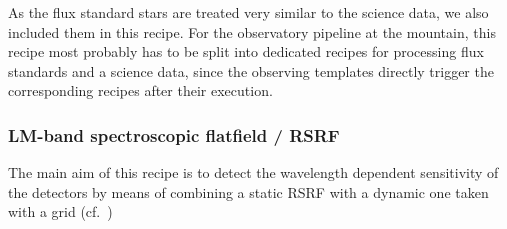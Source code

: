 As the flux standard stars are treated very similar to the science
data, we also included them in this recipe. For the observatory
pipeline at the mountain, this recipe most probably has to be split
into dedicated recipes for processing flux standards and a science
data, since the observing templates directly trigger the corresponding
recipes after their execution.

\clearpage

\subsubsection{LM-band spectroscopic flatfield / RSRF}
\label{sssec:LM_LSS_flat}

The main aim of this recipe is to detect the wavelength dependent
sensitivity of the detectors by means of combining a static \ac{RSRF}
with a dynamic one taken with a grid (cf.~\cite{METIS-calibration_plan})

